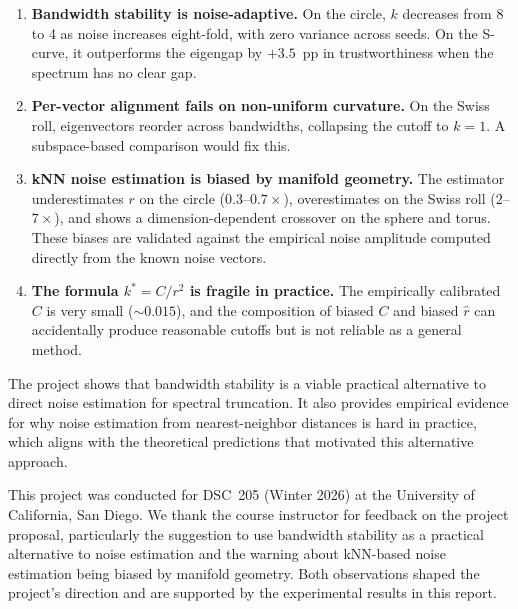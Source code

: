 \documentclass{article}
\begin{document}
\begin{enumerate}
    \item \textbf{Bandwidth stability is noise-adaptive.} On the circle, $k$ decreases from 8 to 4 as noise increases eight-fold, with zero variance across seeds. On the S-curve, it outperforms the eigengap by $+3.5$~pp in trustworthiness when the spectrum has no clear gap.

    \item \textbf{Per-vector alignment fails on non-uniform curvature.} On the Swiss roll, eigenvectors reorder across bandwidths, collapsing the cutoff to $k = 1$. A subspace-based comparison would fix this.

    \item \textbf{kNN noise estimation is biased by manifold geometry.} The estimator underestimates $r$ on the circle ($0.3$--$0.7\times$), overestimates on the Swiss roll ($2$--$7\times$), and shows a dimension-dependent crossover on the sphere and torus. These biases are validated against the empirical noise amplitude computed directly from the known noise vectors.

    \item \textbf{The formula $k^* = C/r^2$ is fragile in practice.} The empirically calibrated $C$ is very small (${\sim}0.015$), and the composition of biased $C$ and biased $\hat{r}$ can accidentally produce reasonable cutoffs but is not reliable as a general method.
\end{enumerate}

The project shows that bandwidth stability is a viable practical alternative to direct noise estimation for spectral truncation. It also provides empirical evidence for why noise estimation from nearest-neighbor distances is hard in practice, which aligns with the theoretical predictions that motivated this alternative approach.

\begin{ack}
This project was conducted for DSC~205 (Winter 2026) at the University of California, San Diego. We thank the course instructor for feedback on the project proposal, particularly the suggestion to use bandwidth stability as a practical alternative to noise estimation and the warning about kNN-based noise estimation being biased by manifold geometry. Both observations shaped the project's direction and are supported by the experimental results in this report.
\end{ack}
\end{document}
